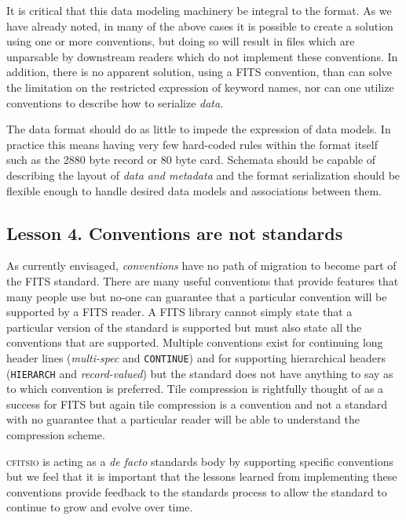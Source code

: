 \documentclass[final,authoryear,5p,times,twocolumn]{elsarticle}
\begin{document}
{{It is critical that this data modeling machinery be integral to the format.
As we have already noted, in many of the above cases it is possible to
create a solution using one or more conventions, but doing so will
result in files which are unparsable by downstream readers which
do not implement these conventions. In addition, there is no apparent
solution, using a FITS convention, than can solve the limitation on the
restricted expression of keyword names, nor can one utilize conventions
to describe how to serialize \textit{data}.


The data format should do as little to impede the expression of data
models.  In practice this means having very few hard-coded rules
within the format itself such as the 2880 byte record or 80 byte card.
Schemata should be capable of describing the layout of \textit{data and metadata}
 and the format serialization should be flexible enough to handle
desired data models and associations between them.


\subsection{Lesson 4. Conventions are not standards}

As currently envisaged, \emph{conventions} have no path of migration
to become part of the FITS standard. There are many useful conventions
that provide features that many people use but no-one can guarantee
that a particular convention will be supported by a FITS reader. A
FITS library cannot simply state that a particular version of the
standard is supported but must also state all the conventions that are
supported. Multiple conventions exist for
continuing long header lines (\emph{multi-spec} and \texttt{CONTINUE})
and for supporting hierarchical headers (\texttt{HIERARCH} and
\emph{record-valued}) but the standard does not have anything to say
as to which convention is preferred. Tile compression is rightfully
thought of as a success for FITS but again tile compression
\citep[e.g.][]{2007ASPC..376..483S,2009PASP..121..414P} is a
convention and not a standard with no guarantee that a particular
reader will be able to understand the compression scheme.

\textsc{cfitsio} is acting as a \emph{de facto} standards body by
supporting specific conventions but we feel that it is important that
the lessons learned from implementing these conventions provide
feedback to the standards process to allow the standard to continue to
grow and evolve over time.

}}
\end{document}
